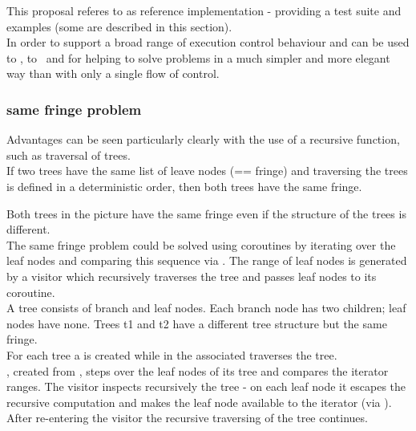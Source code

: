
This proposal referes to \boostcoroutine as reference implementation - providing
a test suite and examples (some are described in this section).\\
\newline
In order to support a broad range of execution control behaviour \pushcoro and
\pullcoro can be used to \escrecloops, to \escreccomps~and for \coopmultitasking
helping to solve problems in a much simpler and more elegant way than with only
a single flow of control.\\

\subsubsection*{same fringe problem}
Advantages can be seen particularly clearly with the use of a recursive
function, such as traversal of trees.\\
If two trees have the same list of leave nodes (== fringe) and traversing the
trees is defined in a deterministic order, then both trees have the same fringe.\\


Both trees in the picture have the same fringe even if the structure of the trees
is different.\\
\newline
The same fringe problem could be solved using coroutines by iterating over the
leaf nodes and comparing this sequence via . The range of leaf
nodes is generated by a visitor which recursively traverses the tree and passes
leaf nodes to its coroutine.\\
\newline
{}
A tree consists of branch and leaf nodes. Each branch node has two children;
leaf nodes have none. Trees t1 and t2 have a different tree structure but the
same fringe.\\
For each tree a \pullcoro is created while in the associated \corofunction
{} traverses the tree.\\
\coroiterator, created from \pullcoro, steps over the leaf nodes of its tree and
 compares the iterator ranges.
\newline
\newline
{}
The visitor inspects recursively the tree - on each leaf node it escapes the
recursive computation and makes the leaf node available to the iterator (via
\pushcoro). After re-entering the visitor the recursive traversing of the tree
continues.
